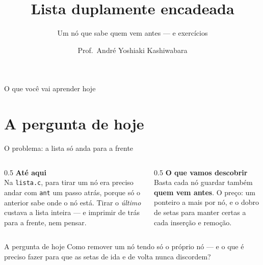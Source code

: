 \documentclass[aspectratio=169]{beamer}
\title{Lista duplamente encadeada}
\subtitle{Um nó que sabe quem vem antes --- e exercícios}
\author{Prof.\ André Yoshiaki Kashiwabara}
\institute{DCOMP -- Universidade Federal de Sergipe\\
\texttt{andreyoshiaki@dcomp.ufs.br}}
\date{}
\begin{document}
\begin{frame}[plain]
  \titlepage
\end{frame}

\begin{frame}{O que você vai aprender hoje}
  \begin{center}
  \end{center}
\end{frame}

\section{A pergunta de hoje}

\begin{frame}{O problema: a lista só anda para a frente}
  \begin{columns}[T]
    \begin{column}{0.5\textwidth}
      \textbf{Até aqui}\\[0.3em]
      \small
      Na \texttt{lista.c}, para tirar um nó era preciso andar com
      \texttt{ant} um passo atrás, porque só o anterior sabe onde o nó
      está. Tirar o \emph{último} custava a lista inteira --- e imprimir de
      trás para a frente, nem pensar.
    \end{column}
    \begin{column}{0.5\textwidth}
      \textbf{O que vamos descobrir}\\[0.3em]
      \small
      Basta cada nó guardar também \textbf{quem vem antes}. O preço: um
      ponteiro a mais por nó, e o dobro de setas para manter certas a cada
      inserção e remoção.
    \end{column}
  \end{columns}
  \begin{block}{A pergunta de hoje}
    Como remover um nó tendo só o próprio nó --- e o que é preciso fazer
    para que as setas de ida e de volta nunca discordem?
  \end{block}
\end{frame}
\end{document}
